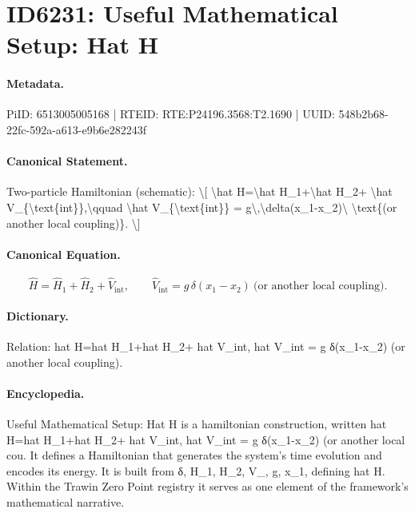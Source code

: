 \section*{ID6231: Useful Mathematical Setup: Hat H}
\paragraph{Metadata.}
PiID: 6513005005168 | RTEID: RTE:P24196.3568:T2.1690 | UUID: 548b2b68-22fc-592a-a613-e9b6e282243f

\paragraph{Canonical Statement.}
Two-particle Hamiltonian (schematic): \textbackslash{}[ \textbackslash{}hat H=\textbackslash{}hat H\_1+\textbackslash{}hat H\_2+ \textbackslash{}hat V\_\{\textbackslash{}text\{int\}\},\textbackslash{}qquad \textbackslash{}hat V\_\{\textbackslash{}text\{int\}\} = g\textbackslash{},\textbackslash{}delta(x\_1-x\_2)\textbackslash{} \textbackslash{}text\{(or another local coupling)\}. \textbackslash{}]

\paragraph{Canonical Equation.}
\[
\hat H=\hat H_1+\hat H_2+ \hat V_{\text{int}},\qquad \hat V_{\text{int}} = g\,\delta(x_1-x_2)\ \text{(or another local coupling)}.
\]

\paragraph{Dictionary.}
Relation: hat H=hat H\_1+hat H\_2+ hat V\_int, hat V\_int = g δ(x\_1-x\_2) (or another local coupling).

\paragraph{Encyclopedia.}
Useful Mathematical Setup: Hat H is a hamiltonian construction, written hat H=hat H\_1+hat H\_2+ hat V\_int, hat V\_int = g δ(x\_1-x\_2) (or another local cou. It defines a Hamiltonian that generates the system's time evolution and encodes its energy. It is built from δ, H\_1, H\_2, V\_, g, x\_1, defining hat H. Within the Trawin Zero Point registry it serves as one element of the framework's mathematical narrative.
